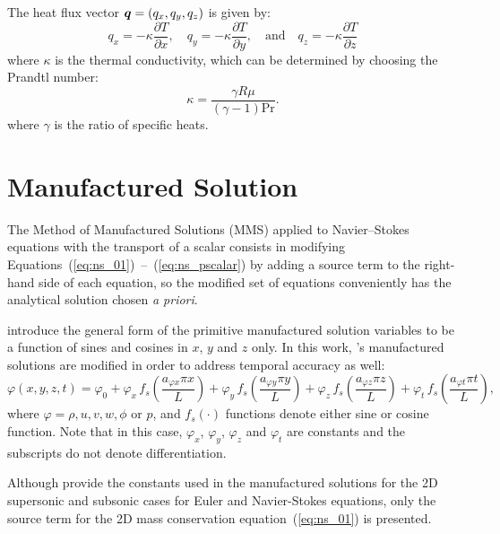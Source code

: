 \documentclass[10pt]{article}
\newcommand{\diff}[2] {\dfrac{\partial #1}{\partial #2}}
\newcommand{\bv}[1]{\ensuremath{\mbox{\boldmath$ #1 $}}}
\begin{document}
The heat flux vector $\bv{q}=(q_x,q_y,q_z)$ is given by:
\begin{equation*}
 q_x = - \kappa  \diff{T}{x}, \quad q_y = - \kappa  \diff{T}{y}, \quad \mbox{and} \quad q_z = - \kappa  \diff{T}{z}
 \end{equation*}
where $\kappa $ is the thermal conductivity, which can be determined by choosing the Prandtl number:
\begin{equation}
 \label{eq:k}
\kappa = \dfrac{\gamma R \mu}{ (\gamma-1) \text{Pr}}.
\end{equation}
where $\gamma$ is the ratio of specific heats.


\section{Manufactured Solution}

The Method of Manufactured Solutions (MMS) applied to Navier--Stokes equations with the transport of a scalar consists in modifying Equations~(\ref{eq:ns_01})~--~(\ref{eq:ns_pscalar}) by adding a source term to the right-hand side of each equation, so the modified set of equations conveniently has the analytical solution chosen \textit{a priori}.

\citet{Roy2002} introduce the general form of the primitive manufactured solution variables to be  a function of sines and cosines in $x$, $y$ and $z$ only. In this work, \citet{Roy2002}'s manufactured solutions are modified in order to address temporal accuracy as well:
\begin{equation}
 \label{eq:manufactured01}
  \varphi (x,y,z,t) = \varphi_0+ \varphi_x\, f_s \left(\frac{a_{\varphi x} \pi x}{L} \right) +  \varphi_y \,f_s\left(\frac{a_{\varphi y} \pi y}{L}\right) + \varphi_z \,f_s\left(\frac{a_{\varphi z} \pi z}{L}\right)+ \varphi_t \,f_s\left(\frac{a_{\varphi t} \pi t}{L}\right),
\end{equation}
where $\varphi=\rho,u,v,w, \phi$ or $p$, and $f_s(\cdot)$ functions denote either sine or cosine function. Note that in this case, $\varphi_x$, $\varphi_y$, $\varphi_z$  and $\varphi_t$ are constants  and the subscripts do not denote differentiation.



Although \citet{Roy2002} provide the constants used in the manufactured solutions for the 2D supersonic and subsonic cases for Euler and Navier-Stokes equations, only the source term for the 2D mass conservation equation~(\ref{eq:ns_01}) is presented.
\end{document}

